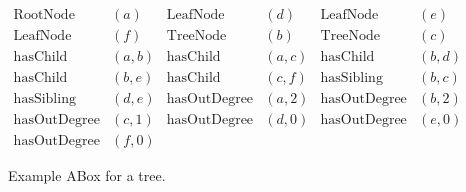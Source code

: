 \begin{figure}[t]
\begin{align*}
\text{RootNode}&(a) &
\text{LeafNode}&(d) &
\text{LeafNode}&(e) \\
\text{LeafNode}&(f)&
\text{TreeNode}&(b) &
\text{TreeNode}&(c)\\
\text{hasChild}&(a,b) &
\text{hasChild}&(a,c) &
\text{hasChild}&(b,d) \\
\text{hasChild}&(b,e)&
\text{hasChild}&(c,f) &
\text{hasSibling}&(b,c)\\ 
\text{hasSibling}&(d,e) &
\text{hasOutDegree}&(a,2) &
\text{hasOutDegree}&(b,2)\\
\text{hasOutDegree}&(c,1) &
\text{hasOutDegree}&(d,0) &
\text{hasOutDegree}&(e,0)\\
\text{hasOutDegree}&(f,0)
\end{align*}
\caption{Example ABox for a tree.}\label{fig:tree-example}
\end{figure}

